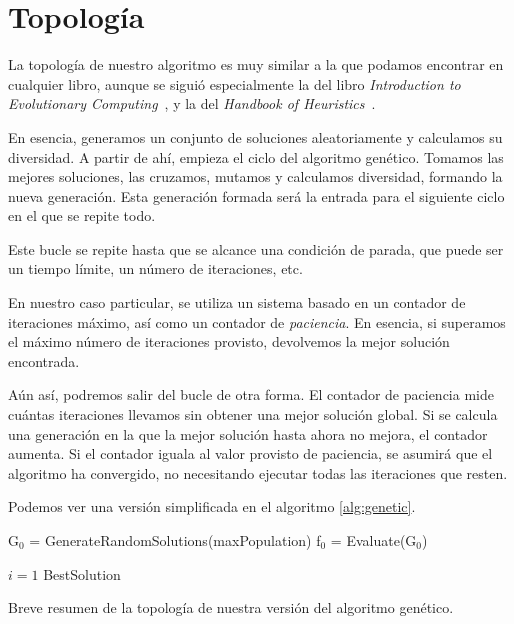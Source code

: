 \section{Topología}

La topología de nuestro algoritmo es muy similar a la que podamos encontrar en cualquier libro, aunque se siguió especialmente la del libro \textit{Introduction to Evolutionary Computing}~\cite{evolutionaryEiben}, y la del \textit{Handbook of Heuristics}~\cite{handbookMart}.


En esencia, generamos un conjunto de soluciones aleatoriamente y calculamos su diversidad. A partir de ahí, empieza el ciclo del algoritmo genético. Tomamos las mejores soluciones, las cruzamos, mutamos y calculamos diversidad, formando la nueva generación. Esta generación formada será la entrada para el siguiente ciclo en el que se repite todo.

Este bucle se repite hasta que se alcance una condición de parada, que puede ser un tiempo límite, un número de iteraciones, etc.

En nuestro caso particular, se utiliza un sistema basado en un contador de iteraciones máximo, así como un contador de \textit{paciencia}. En esencia, si superamos el máximo número de iteraciones provisto, devolvemos la mejor solución encontrada.

Aún así, podremos salir del bucle de otra forma. El contador de paciencia mide cuántas iteraciones llevamos sin obtener una mejor solución global. Si se calcula una generación en la que la mejor solución hasta ahora no mejora, el contador aumenta. Si el contador iguala al valor provisto de paciencia, se asumirá que el algoritmo ha convergido, no necesitando ejecutar todas las iteraciones que resten.

Podemos ver una versión simplificada en el algoritmo \ref{alg:genetic}.

\begin{algorithm}[h]
    G$_{0}$ = GenerateRandomSolutions(maxPopulation)\;
    f$_{0}$ = Evaluate(G$_{0}$)

    $i = 1$\;
        \Return BestSolution\;
    
    \caption{Breve resumen de la topología de nuestra versión del algoritmo genético.}
    \label{alg:genetic}
\end{algorithm}

